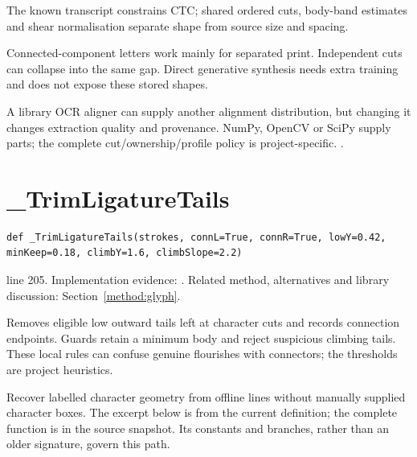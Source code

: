 The known transcript constrains CTC; shared ordered cuts, body-band estimates and shear normalisation separate shape from source size and spacing.


Connected-component letters work mainly for separated print. Independent cuts can collapse into the same gap. Direct generative synthesis needs extra training and does not expose these stored shapes.


A library OCR aligner can supply another alignment distribution, but changing it changes extraction quality and provenance. NumPy, OpenCV or SciPy supply parts; the complete cut/ownership/profile policy is project-specific. \cite{graves2006,vinciarelli2001,code2026}.


\section{\_TrimLigatureTails}\label{fn:style:-TrimLigatureTails}
\begin{lstlisting}[style=sig]
def _TrimLigatureTails(strokes, connL=True, connR=True, lowY=0.42, minKeep=0.18, climbY=1.6, climbSlope=2.2)
\end{lstlisting}
 line 205. Implementation evidence: \cite{code2026}. Related method, alternatives and library discussion: Section~\ref{method:glyph}.


Removes eligible low outward tails left at character cuts and records connection endpoints. Guards retain a minimum body and reject suspicious climbing tails. These local rules can confuse genuine flourishes with connectors; the thresholds are project heuristics.


Recover labelled character geometry from offline lines without manually supplied character boxes. The excerpt below is from the current definition; the complete function is in the source snapshot. Its constants and branches, rather than an older signature, govern this path.


